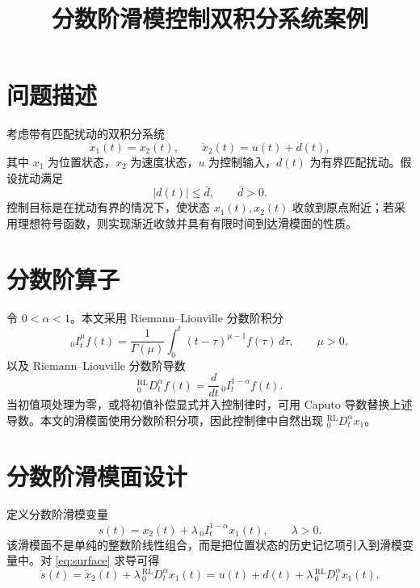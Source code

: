 \documentclass[UTF8,a4paper,11pt]{ctexart}
\title{分数阶滑模控制双积分系统案例}
\author{}
\date{}
\begin{document}
\maketitle

\section{问题描述}

考虑带有匹配扰动的双积分系统
\begin{equation}
  \dot{x}_1(t)=x_2(t),\qquad
  \dot{x}_2(t)=u(t)+d(t),
  \label{eq:plant}
\end{equation}
其中 $x_1$ 为位置状态，$x_2$ 为速度状态，$u$ 为控制输入，$d(t)$ 为有界匹配扰动。假设扰动满足
\begin{equation}
  |d(t)|\le \bar d,\qquad \bar d>0.
\end{equation}
控制目标是在扰动有界的情况下，使状态 $x_1(t),x_2(t)$ 收敛到原点附近；若采用理想符号函数，则实现渐近收敛并具有有限时间到达滑模面的性质。

\section{分数阶算子}

令 $0<\alpha<1$。本文采用 Riemann--Liouville 分数阶积分
\begin{equation}
  {}_0 I_t^\mu f(t)
  =
  \frac{1}{\Gamma(\mu)}
  \int_0^t (t-\tau)^{\mu-1} f(\tau)\,d\tau,
  \qquad \mu>0,
\end{equation}
以及 Riemann--Liouville 分数阶导数
\begin{equation}
  {}_0^{\mathrm{RL}}D_t^\alpha f(t)
  =
  \frac{d}{dt}\,{}_0 I_t^{1-\alpha}f(t).
\end{equation}
当初值项处理为零，或将初值补偿显式并入控制律时，可用 Caputo 导数替换上述导数。本文的滑模面使用分数阶积分项，因此控制律中自然出现 ${}_0^{\mathrm{RL}}D_t^\alpha x_1$。

\section{分数阶滑模面设计}

定义分数阶滑模变量
\begin{equation}
  s(t)=x_2(t)+\lambda\,{}_0 I_t^{1-\alpha}x_1(t),
  \qquad \lambda>0.
  \label{eq:surface}
\end{equation}
该滑模面不是单纯的整数阶线性组合，而是把位置状态的历史记忆项引入到滑模变量中。对 \eqref{eq:surface} 求导可得
\begin{equation}
  \dot{s}(t)
  =
  \dot{x}_2(t)+\lambda\,{}_0^{\mathrm{RL}}D_t^\alpha x_1(t)
  =
  u(t)+d(t)+\lambda\,{}_0^{\mathrm{RL}}D_t^\alpha x_1(t).
  \label{eq:sdot-open}
\end{equation}
\end{document}
